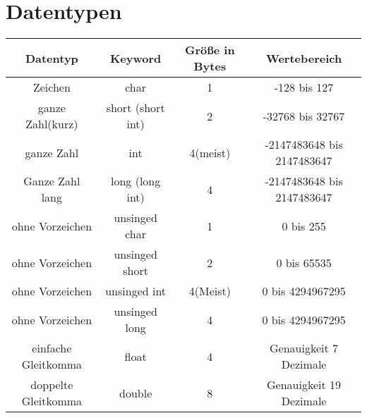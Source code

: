 \documentclass[10pt,a5paper]{report}
\author{Christian BÃÂ¶hm}
\begin{document}
\section{Datentypen}
\begin{tabular}{|c|c|c|c|}
\hline \rule[-2ex]{0pt}{5.5ex} Datentyp & Keyword & Größe in Bytes & 
Wertebereich \\ 
\hline \rule[-2ex]{0pt}{5.5ex} Zeichen & char & 1 & -128 bis 127 \\ 
\hline \rule[-2ex]{0pt}{5.5ex} ganze Zahl(kurz) & short (short int) & 2 & -32768 bis 32767 \\ 
\hline \rule[-2ex]{0pt}{5.5ex} ganze Zahl & int & 4(meist) & -2147483648 bis 2147483647 \\ 
\hline \rule[-2ex]{0pt}{5.5ex} Ganze Zahl lang & long (long int) & 4 & -2147483648 bis 2147483647 \\ 
\hline \rule[-2ex]{0pt}{5.5ex} ohne Vorzeichen & unsinged char & 1 & 0 bis 255 \\ 
\hline \rule[-2ex]{0pt}{5.5ex} ohne Vorzeichen & unsinged short & 2 & 0 bis 65535 \\ 
\hline \rule[-2ex]{0pt}{5.5ex} ohne Vorzeichen & unsinged int & 4(Meist) & 0 bis 4294967295  \\ 
\hline \rule[-2ex]{0pt}{5.5ex} ohne Vorzeichen & unsinged long & 4 & 0 bis 4294967295  \\ 
\hline \rule[-2ex]{0pt}{5.5ex} einfache Gleitkomma & float & 4 & Genauigkeit 7 Dezimale  \\ 
\hline \rule[-2ex]{0pt}{5.5ex} doppelte Gleitkomma & double & 8 & Genauigkeit 19 Dezimale  \\
\hline 
\end{tabular}
\newpage
\end{document}
